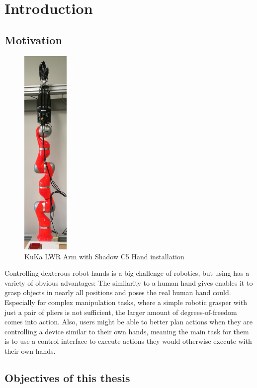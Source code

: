 \chapter{Introduction}
\section{Motivation}

\begin{figure}
	\caption{KuKa LWR Arm with Shadow C5 Hand installation\label{fig:armwithhand}}
	\includegraphics[width=0.2\textwidth]{assets/chpt_intro/lwr_c5hand.jpg}
\end{figure}

Controlling dexterous robot hands is a big challenge of robotics, but using has a variety of obvious advantages: The similarity to a human hand gives enables it to grasp objects in nearly all positions and poses the real human hand could. Especially for complex manipulation tasks, where a simple robotic grasper with just a pair of pliers is not sufficient, the larger amount of degrees-of-freedom comes into action. Also, users might be able to better plan actions when they are controlling a device similar to their own hands, meaning the main task for them is to use a control interface to execute actions they would otherwise execute with their own hands.

\section{Objectives of this thesis}

